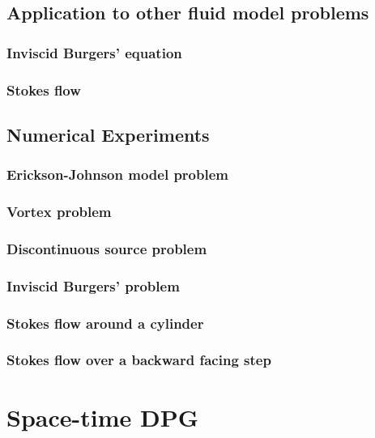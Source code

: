 \documentclass{report}
\begin{document}
\section{Application to other fluid model problems}

\subsection{Inviscid Burgers' equation}

\subsection{Stokes flow}


\section{Numerical Experiments}

\subsection{Erickson-Johnson model problem}

\subsection{Vortex problem}

\subsection{Discontinuous source problem}

\subsection{Inviscid Burgers' problem}

\subsection{Stokes flow around a cylinder}

\subsection{Stokes flow over a backward facing step}



\chapter{Space-time DPG}
\end{document}
